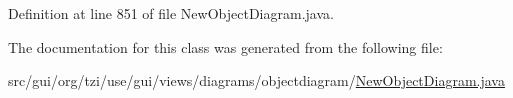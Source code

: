 Definition at line 851 of file New\-Object\-Diagram.\-java.



The documentation for this class was generated from the following file\-:\begin{DoxyCompactItemize}
\item 
src/gui/org/tzi/use/gui/views/diagrams/objectdiagram/\hyperlink{_new_object_diagram_8java}{New\-Object\-Diagram.\-java}\end{DoxyCompactItemize}
